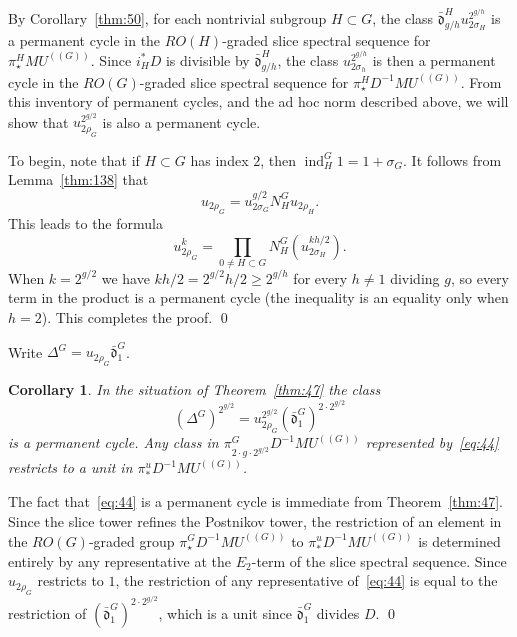 \documentclass{amsart}
\newtheorem{cor}[equation]{Corollary}
\theoremstyle{definition}
\theoremstyle{remark}
\newenvironment{pf}{\bigskip{\em Proof:\/}}{\qed\medskip}
\newcommand{\mutn}[1]{MU^{(\!(#1)\!)}}
\newcommand{\norm}{N}
\newcommand{\piu}{\pi^{u}}
\DeclareMathOperator{\ind}{ind}
\newcommand{\gbar}{\bar}
\newcommand{\normrbar}{\gbar{\mathfrak d}}
\newcommand{\normr}{\Delta}
\newcommand{\D}{D} %
\begin{document}
\begin{pf}
By Corollary~\ref{thm:50}, for each nontrivial subgroup $H\subset G$,
the class $\normrbar_{g/h}^{H} u_{2\sigma_{H}}^{2^{g/h}}$ is a
permanent cycle in the $RO(H)$-graded slice spectral sequence for
$\pi^{H}_{\star}\mutn{G}$.  Since $i_{H}^{\ast}D$ is divisible by
$\normrbar_{g/h}^{H}$, the class $u_{2\sigma_{h}}^{2^{g/h}}$ is then a
permanent cycle in the $RO(G)$-graded slice spectral sequence for
$\pi^{H}_{\star}D^{-1}\mutn{G}$.  From this inventory of permanent
cycles, and the ad hoc norm described above, we will show that
$u_{2\rho_{G}}^{2^{g/2}}$ is also a permanent cycle.

To begin, note that if $H\subset G$ has index $2$, then
$\ind_{H}^{G}1=1+\sigma_{G}$.  It follows from Lemma~\ref{thm:138}
that 
\[
u_{2\rho_{G}}=u_{2 \sigma_{G}}^{g/2} \norm_{H}^{G}
u_{2\rho_{H}}. 
\]
This leads to the formula
\[
u_{2\rho_{G}}^{k} = \prod_{0\ne H\subset G} \norm_{H}^{G}(u_{2\sigma_{H}}^{k
h/2}).
\]
When $k=2^{g/2}$ we have $kh/2=2^{g/2}h/2\ge 2^{g/h}$ for every $h\ne
1$ dividing $g$, so every term in the product is a permanent cycle
(the inequality is an equality only when $h=2$).  This completes the
proof.
\end{pf}


Write $\normr^{G} = u_{2\rho_{G}}\normrbar_{1}^{G}$.

\begin{cor}
\label{thm:139}
In the situation of Theorem~\ref{thm:47} the class
\begin{equation}\label{eq:44}
(\normr^{G})^{2^{g/2}} =
u_{2\rho_{G}}^{2^{g/2}}(\normrbar_{1}^{G})^{2\cdot 2^{g/2}}
\end{equation}
is a permanent cycle.  Any class in $\pi^{G}_{2\cdot g\cdot
2^{g/2}}\D^{-1}\mutn{G}$ represented by~\eqref{eq:44} restricts to a
unit in $\piu_{\ast}\D^{-1}\mutn{G}$.
\end{cor}

\begin{pf}
The fact that~\eqref{eq:44} is a permanent cycle is immediate from
Theorem~\ref{thm:47}.  Since the slice tower refines the Postnikov
tower, the restriction of an element in the $RO(G)$-graded group
$\pi^{G}_{\star}\D^{-1}\mutn{G}$ to $\piu_{\ast}\D^{-1}\mutn{G}$ is
determined entirely by any representative at the $E_{2}$-term of the
slice spectral sequence.  Since $u_{2\rho_{G}}$ restricts to $1$, the
restriction of any representative of~\eqref{eq:44} is equal to the
restriction of $(\normrbar_{1}^{G})^{2\cdot 2^{g/2}}$, which is a unit
since $\normrbar_{1}^{G}$ divides $\D$.
\end{pf}
\end{document}
